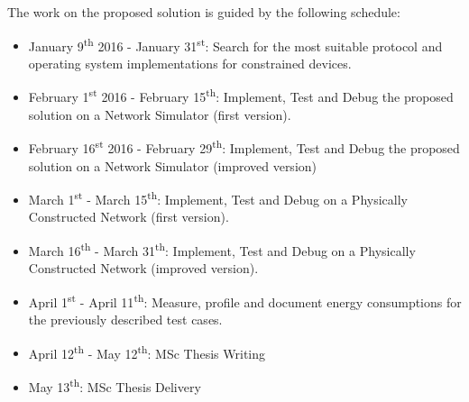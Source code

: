 The work on the proposed solution is guided by the following schedule:

\begin{itemize}
	\item January 9\textsuperscript{th} 2016 - January 31\textsuperscript{st}: Search for the most suitable protocol and operating system implementations for constrained devices.
	\item February 1\textsuperscript{st} 2016 - February 15\textsuperscript{th}: Implement, Test and Debug the proposed solution on a Network Simulator (first version).
	\item February 16\textsuperscript{st} 2016 - February 29\textsuperscript{th}: Implement, Test and Debug the proposed solution on a Network Simulator (improved version)
	\item March 1\textsuperscript{st} - March 15\textsuperscript{th}: Implement, Test and Debug on a Physically Constructed Network (first version).
	\item March 16\textsuperscript{th} - March 31\textsuperscript{th}: Implement, Test and Debug on a Physically Constructed Network (improved version).
	\item April 1\textsuperscript{st} - April 11\textsuperscript{th}: Measure, profile and document energy consumptions for the previously described test cases.
	\item April 12\textsuperscript{th} - May 12\textsuperscript{th}: MSc Thesis Writing
	\item May 13\textsuperscript{th}: MSc Thesis Delivery
\end{itemize}